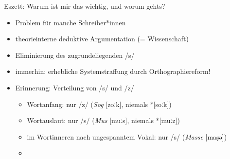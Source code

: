 \begin{frame}
  {Eszett: Warum ist mir das wichtig, und worum gehts?}
  \pause
  \begin{itemize}[<+->]
    \item Problem für manche Schreiber*innen
    \item theorieinterne deduktive Argumentation (= Wissenschaft)
    \item Eliminierung des zugrundeliegenden /s/
      \Halbzeile
    \item immerhin: erhebliche \alert{Systemstraffung} durch Orthographiereform!
      \Halbzeile
    \item Erinnerung: Verteilung von /s/ und /z/
      \begin{itemize}[<+->]
        \item Wortanfang: nur /z/ (\textit{Sog} [zoːk], niemals *[soːk])
        \item Wortauslaut: nur /s/ (\textit{Mus} [muːs], niemals *[muːz])
        \item \alert{im Wortinneren nach ungespanntem Vokal: nur /s/ (\textit{Masse} [maṣə])}
        \item {}
      \end{itemize}
  \end{itemize}
\end{frame}


\newcommand{\phopro}{\ensuremath{\Rightarrow}}

